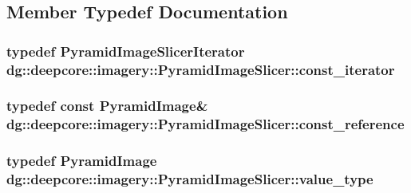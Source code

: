 \subsection{Member Typedef Documentation}
\subsubsection[{\texorpdfstring{const\+\_\+iterator}{const_iterator}}]{\setlength{\rightskip}{0pt plus 5cm}typedef {\bf Pyramid\+Image\+Slicer\+Iterator} {\bf dg\+::deepcore\+::imagery\+::\+Pyramid\+Image\+Slicer\+::const\+\_\+iterator}}\hypertarget{classdg_1_1deepcore_1_1imagery_1_1_pyramid_image_slicer_ae7aff5a41f1137d54f566127aa2bb957}{}\label{classdg_1_1deepcore_1_1imagery_1_1_pyramid_image_slicer_ae7aff5a41f1137d54f566127aa2bb957}
\subsubsection[{\texorpdfstring{const\+\_\+reference}{const_reference}}]{\setlength{\rightskip}{0pt plus 5cm}typedef const {\bf Pyramid\+Image}\& {\bf dg\+::deepcore\+::imagery\+::\+Pyramid\+Image\+Slicer\+::const\+\_\+reference}}\hypertarget{classdg_1_1deepcore_1_1imagery_1_1_pyramid_image_slicer_ae420ea4b1c5ecc7801eb1a827cfa6252}{}\label{classdg_1_1deepcore_1_1imagery_1_1_pyramid_image_slicer_ae420ea4b1c5ecc7801eb1a827cfa6252}
\subsubsection[{\texorpdfstring{value\+\_\+type}{value_type}}]{\setlength{\rightskip}{0pt plus 5cm}typedef {\bf Pyramid\+Image} {\bf dg\+::deepcore\+::imagery\+::\+Pyramid\+Image\+Slicer\+::value\+\_\+type}}\hypertarget{classdg_1_1deepcore_1_1imagery_1_1_pyramid_image_slicer_a6a2ca5ffdf4ce25771ce96dec3be678a}{}\label{classdg_1_1deepcore_1_1imagery_1_1_pyramid_image_slicer_a6a2ca5ffdf4ce25771ce96dec3be678a}


